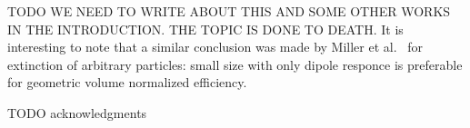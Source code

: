 \documentclass[aps,prl,twocolumn,showpacs,superscriptaddress,groupedaddress]{revtex4-1}
\begin{document}
TODO WE NEED TO WRITE ABOUT THIS AND SOME OTHER WORKS IN THE
INTRODUCTION. THE TOPIC IS DONE TO DEATH.  It is interesting to note
that a similar conclusion was made by Miller et al.~\cite{Miller-2014}
for extinction of arbitrary particles: small size with only dipole
responce is preferable for geometric volume normalized efficiency.


\begin{acknowledgments}

  TODO acknowledgments
\end{acknowledgments}


\end{document}
